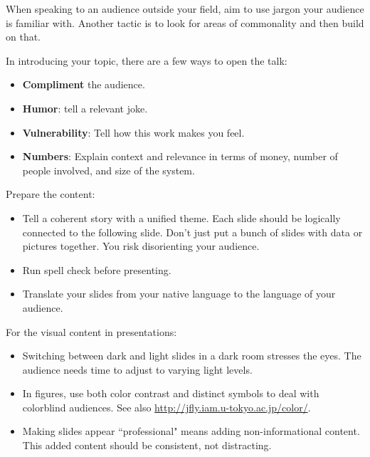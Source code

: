 When speaking to an audience outside your field, aim to use jargon your audience is familiar with. Another tactic is to look for areas of commonality and then build on that.

In introducing your topic, there are a few ways to open the talk:
\begin{itemize}
    \item \textbf{Compliment} the audience.
    \item \textbf{Humor}: tell a relevant joke.
    \item \textbf{Vulnerability}: Tell how this work makes you feel.
    \item \textbf{Numbers}: Explain context and relevance in terms of money, number of people involved, and size of the system.
\end{itemize}



Prepare the content:
\begin{itemize}
    \item Tell a coherent story with a unified theme. Each slide should be logically connected to the following slide. Don't just put a bunch of slides with data or pictures together. You risk disorienting your audience.
    \item Run spell check before presenting.
    \item Translate your slides from your native language to the language of your audience.
\end{itemize}


For the visual content in presentations:
\begin{itemize}
    \item Switching between dark and light slides in a dark room stresses the eyes. The audience needs time to adjust to varying light levels.
    \item In figures, use both color contrast and distinct symbols to deal with colorblind audiences. See also \href{http://jfly.iam.u-tokyo.ac.jp/color/}{http://jfly.iam.u-tokyo.ac.jp/color/}.
    \item Making slides appear ``professional" means adding non-informational content. This added content should be consistent, not distracting.
\end{itemize}

